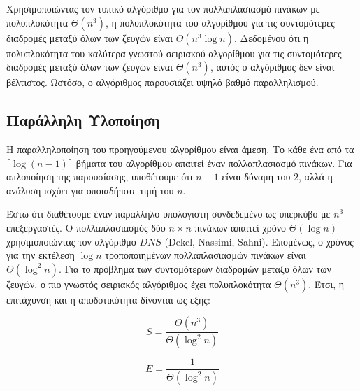 \documentclass[12pt,a4paper]{article} %
\begin{document}
{Χρησιμοποιώντας τον τυπικό αλγόριθμο για τον πολλαπλασιασμό πινάκων με πολυπλοκότητα $\Theta(n^3)$, η πολυπλοκότητα του αλγορίθμου για τις συντομότερες διαδρομές μεταξύ όλων των ζευγών είναι $\Theta(n^3\log n)$. Δεδομένου ότι η πολυπλοκότητα του καλύτερα γνωστού σειριακού αλγορίθμου για τις συντομότερες διαδρομές μεταξύ όλων των ζευγών είναι $\Theta(n^3)$, αυτός ο αλγόριθμος δεν είναι βέλτιστος. Ωστόσο, ο αλγόριθμος παρουσιάζει υψηλό βαθμό παραλληλισμού.

\subsection*{Παράλληλη Υλοποίηση}
Η παραλληλοποίηση του προηγούμενου αλγορίθμου είναι άμεση. Το κάθε ένα από τα \mbox{$\lceil\log(n-1)\rceil$} βήματα του αλγορίθμου απαιτεί έναν πολλαπλασιασμό πινάκων. Για απλοποίηση της παρουσίασης, υποθέτουμε ότι $n-1$ είναι δύναμη του $2$, αλλά η ανάλυση ισχύει για οποιαδήποτε τιμή του $n$.

Έστω ότι διαθέτουμε έναν παραλληλο υπολογιστή συνδεδεμένο ως υπερκύβο με $n^3$ επεξεργαστές. Ο πολλαπλασιασμός δύο $n\times n$ πινάκων απαιτεί χρόνο $\Theta(\log n)$ χρησιμοποιώντας τον αλγόριθμο $DNS$ (Dekel, Nassimi, Sahni). Επομένως, ο χρόνος για την εκτέλεση $\log n$ τροποποιημένων πολλαπλασιασμών πινάκων είναι $\Theta(\log^2 n)$. Για το πρόβλημα των συντομότερων διαδρομών μεταξύ όλων των ζευγών, ο πιο γνωστός σειριακός αλγόριθμος έχει πολυπλοκότητα $\Theta(n^3)$. Έτσι, η επιτάχυνση και η αποδοτικότητα δίνονται ως εξής:

\[
S = \frac{\Theta(n^3)}{\Theta(\log^2 n)}
\]

\[
E = \frac{1}{\Theta(\log^2 n)}
\]
\vspace{0.3cm}
\begin{figure}[ht]
\centering
{}
\end{figure}}
\end{document}
